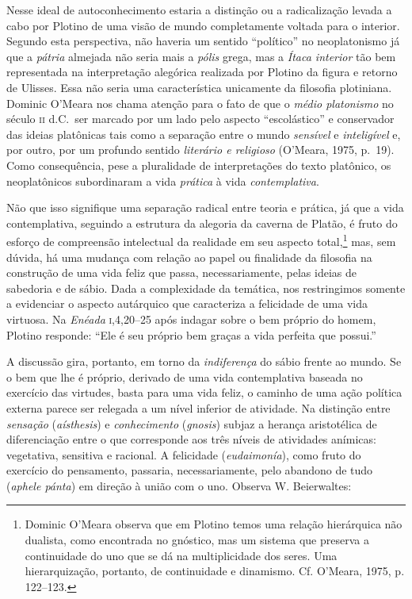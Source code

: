 {Nesse ideal de autoconhecimento estaria a distinção ou a
radicalização levada a cabo por Plotino de uma visão de mundo
completamente voltada para o interior. Segundo esta perspectiva, não
haveria um sentido “político” no neoplatonismo já que a \emph{pátria}
almejada não seria mais a \emph{pólis} grega, mas a \emph{Ítaca
interior} tão bem representada na interpretação alegórica realizada por
Plotino da figura e retorno de Ulisses. Essa não seria uma
característica unicamente da filosofia plotiniana. Dominic O’Meara nos
chama atenção para o fato de que o \emph{médio platonismo} no século
\textsc{ii} d.C.~ser marcado por um lado pelo aspecto “escolástico” e conservador
das ideias platônicas tais como a separação entre o mundo
\emph{sensível }e \emph{inteligível} e, por outro, por um profundo
sentido \emph{literário e religioso} (O’Meara, 1975, p.~19). Como
consequência, pese a pluralidade de interpretações do texto platônico,
os neoplatônicos subordinaram a vida\emph{ prática} à vida
\emph{contemplativa}. 

Não que isso signifique uma separação radical entre teoria e
prática, já que a vida contemplativa, seguindo a estrutura da alegoria
da caverna de Platão, é fruto do esforço de compreensão intelectual da
realidade em seu aspecto total,\footnote{ Dominic O’Meara observa que
em Plotino temos uma relação hierárquica não dualista, como encontrada
no gnóstico, mas um sistema que preserva a continuidade do uno que se
dá na multiplicidade dos seres. Uma hierarquização, portanto, de
continuidade e dinamismo. Cf. O’Meara, 1975, p. 122--123.} mas,
sem dúvida, há uma mudança com relação ao papel ou finalidade da
filosofia na construção de uma vida feliz que passa, necessariamente,
pelas ideias de sabedoria e de sábio. Dada a complexidade da temática,
nos restringimos somente a evidenciar o aspecto autárquico que
caracteriza a felicidade de uma vida virtuosa. Na \emph{Enéada}
\textsc{i},4,20--25 após indagar sobre o bem próprio do homem, Plotino responde:
``Ele é seu próprio bem graças a vida perfeita que possui.''

A discussão gira, portanto, em torno da \emph{indiferença }do
sábio frente ao mundo. Se o bem que lhe é próprio, derivado de uma vida
contemplativa baseada no exercício das virtudes, basta para uma vida
feliz, o caminho de uma ação política externa parece ser relegada a um
nível inferior de atividade. Na distinção entre \emph{sensação}
(\emph{aísthesis}) e \emph{conhecimento }(\emph{gnosis}) subjaz a
herança aristotélica de diferenciação entre o que corresponde aos três
níveis de atividades anímicas: vegetativa, sensitiva e racional. A
felicidade (\emph{eudaimonía}), como fruto do exercício do
pensamento, passaria, necessariamente, pelo abandono de tudo
(\emph{aphele pánta}) em direção à união com o uno. Observa W.
Beierwaltes:

}
